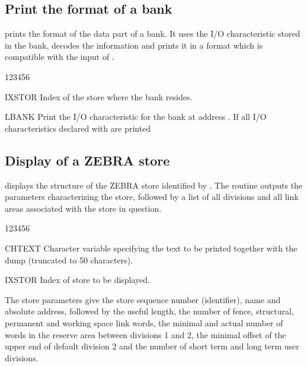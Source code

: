\newpage
\subsection{Print the format of a bank}
\Action
{} prints the format of the data part of a bank.
It uses the I/O characteristic stored in the bank, decodes the
information and prints it in a format which is compatible with the
input of .

\begin{DLtt}{123456}
\item[IXSTOR]Index of the store where the bank resides.
\item[LBANK]Print the I/O characteristic for the bank at address .
\newline If  all I/O characteristics declared with
 are printed
\end{DLtt}
\subsection{Display of a ZEBRA store}


\Action
{} displays the structure of the ZEBRA store identified by
.
The routine outputs the parameters characterizing the store, followed by a
list of all divisions and all link areas associated with the store in
question.

\begin{DLtt}{123456}
\item[CHTEXT]Character variable specifying the text to be printed
together with the dump (truncated to 50 characters).
\item[IXSTOR]Index of store to be displayed.
\end{DLtt}

The store parameters give the store sequence number (identifier),
name and
absolute address, followed by the useful length, the number of fence,
structural, permanent and working space link words, the minimal and
actual number of words in the reserve area between divisions 1 and 2,
the minimal offset of the upper end of default division 2 and the
number of short term and long term user divisions.

